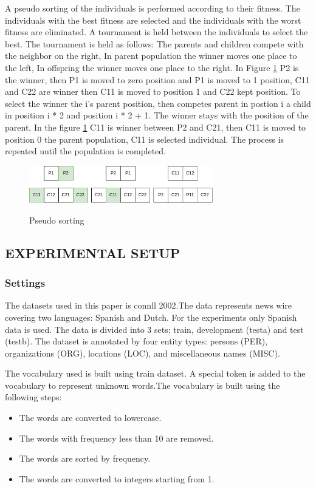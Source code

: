 \documentclass{IEEEtran}
\begin{document}
A pseudo sorting of the individuals is performed according to their fitness. The individuals with the best fitness are selected and the individuals with the worst fitness are eliminated. A tournament is held between the individuals to select the best. The tournament is held as follows: The parents and children compete with the neighbor on the right, In parent population the winner moves one place to the left, In offspring the winner moves one place to the right. In Figure \ref{fig:seudo_sort} P2 is the winner, then P1 is moved to zero position and P1 is moved to 1 position, C11 and C22 are winner then C11 is moved to position 1 and C22 kept position. To select the winner the i's parent position, then competes parent in postion i a child in position i * 2 and position i * 2 + 1. The winner stays with the position of the parent, In the figure \ref{fig:seudo_sort} C11 is winner between P2 and C21, then C11 is moved to position 0 the parent population, C11 is selected individual. The process is repeated until the population is completed.

\begin{figure}[ht]
  \caption{Pseudo sorting}
  \centering
  \includegraphics[width=8cm]{img/pseudo_sort.png}
  \label{fig:seudo_sort}
\end{figure}


\subsection{EXPERIMENTAL SETUP}

\subsubsection{Settings}

The datasets used in this paper is connll 2002\cite{tjong-kim-sang-2002-introduction}.The data represents news wire covering two languages: Spanish and Dutch. For the experiments only Spanish data is used. The data is divided into 3 sets: train, development (testa) and test (testb). The dataset is annotated by four entity types: persons (PER), organizations (ORG), locations (LOC), and miscellaneous names (MISC).

The vocabulary used is built using train dataset. A special token is added to the vocabulary to represent unknown words.The vocabulary is built using the following steps:
\begin{itemize}
  \item The words are converted to lowercase.
  \item The words with frequency less than 10 are removed.
  \item The words are sorted by frequency.
  \item The words are converted to integers starting from 1.
\end{itemize}
\end{document}
